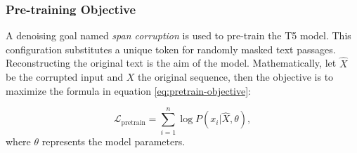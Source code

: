 \documentclass{dhbenelux}
\begin{document}
\subsubsection{Pre-training Objective}
A denoising goal named \textit{span corruption} is used to pre-train the T5 model. This configuration substitutes a unique token for randomly masked text passages. Reconstructing the original text is the aim of the model. Mathematically, let \( \hat{X} \) be the corrupted input and \( X \) the original sequence, then the objective is to maximize the formula in equation \ref{eq:pretrain-objective}:

\begin{equation}
\mathcal{L}_{\text{pretrain}} = \sum_{i=1}^n \log P(x_i | \hat{X}, \theta),
\label{eq:pretrain-objective}
\end{equation}
where \( \theta \) represents the model parameters.
\end{document}
